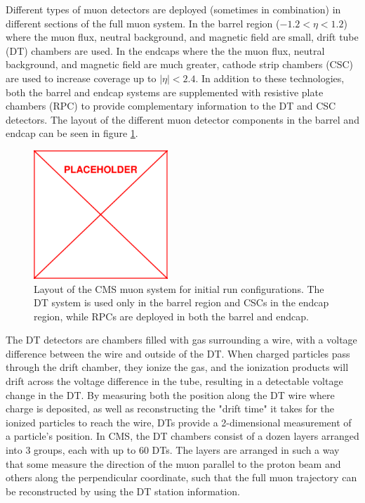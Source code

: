 Different types of muon detectors are deployed (sometimes in combination) in different sections of the full muon system. In the barrel region ($-1.2<\eta<1.2$) where the muon flux, neutral background, and magnetic field are small, drift tube (DT) chambers are used. In the endcaps where the the muon flux, neutral background, and magnetic field are much greater, cathode strip chambers (CSC) are used to increase coverage up to $|\eta|<2.4$. In addition to these technologies, both the barrel and endcap systems are supplemented with resistive plate chambers (RPC) to provide complementary information to the DT and CSC detectors. The layout of the different muon detector components in the barrel and endcap can be seen in figure \ref{fig:muonGeometry}.
 \begin{figure}
	\centering
	\includegraphics[width=0.45\textwidth]{figs/placeholder}
	\caption{Layout of the CMS muon system for initial run configurations. The DT system is used only in the barrel region and CSCs in the endcap region, while RPCs are deployed in both the barrel and endcap.}
	\label{fig:muonGeometry}
\end{figure}

The DT detectors are chambers filled with gas surrounding a wire, with a voltage difference between the wire and outside of the DT. When charged particles pass through the drift chamber, they ionize the gas, and the ionization products will drift across the voltage difference in the tube, resulting in a detectable voltage change in the DT. By measuring both the position along the DT wire where charge is deposited, as well as reconstructing the "drift time" it takes for the ionized particles to reach the wire, DTs provide a 2-dimensional measurement of a particle's position. In CMS, the DT chambers consist of a dozen layers arranged into 3 groups, each with up to 60 DTs. The layers are arranged in such a way that some measure the direction of the muon parallel to the proton beam and others along the perpendicular coordinate, such that the full muon trajectory can be reconstructed by using the DT station information.

